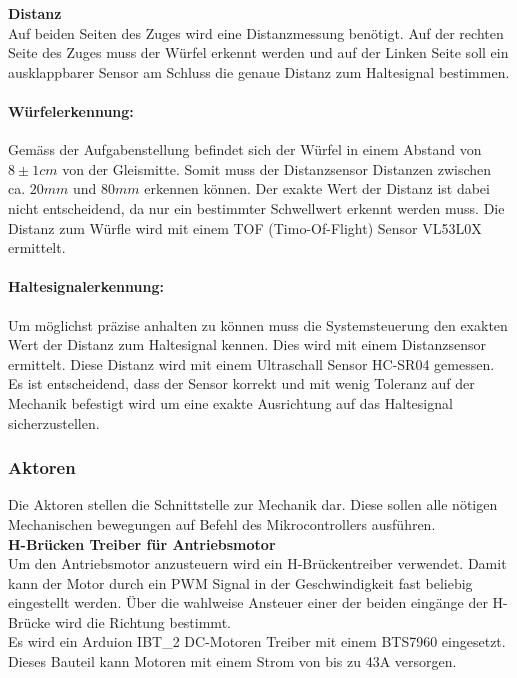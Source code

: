 \documentclass[../../main.tex]{subfiles}
\begin{document}
    \textbf{Distanz}\\
    Auf beiden Seiten des Zuges wird eine Distanzmessung benötigt. Auf der rechten Seite des Zuges muss der Würfel erkennt werden und auf der Linken Seite soll ein ausklappbarer Sensor am Schluss die genaue Distanz zum Haltesignal bestimmen.

    \paragraph{Würfelerkennung:}
    Gemäss der Aufgabenstellung befindet sich der Würfel in einem Abstand von $8\pm1cm$ von der Gleismitte. Somit muss der Distanzsensor Distanzen zwischen ca. $20mm$ und $80mm$ erkennen können. Der exakte Wert der Distanz ist dabei nicht entscheidend, da nur ein bestimmter Schwellwert erkennt werden muss. Die Distanz zum Würfle wird mit einem TOF (Timo-Of-Flight) Sensor VL53L0X ermittelt.

    \paragraph{Haltesignalerkennung:}
    Um möglichst präzise anhalten zu können muss die Systemsteuerung den exakten Wert der Distanz zum Haltesignal kennen. Dies wird mit einem Distanzsensor ermittelt. Diese Distanz wird mit einem Ultraschall Sensor HC-SR04 gemessen. Es ist entscheidend, dass der Sensor korrekt und mit wenig Toleranz auf der Mechanik befestigt wird um eine exakte Ausrichtung auf das Haltesignal sicherzustellen.
    
    \subsubsection{Aktoren}
    Die Aktoren stellen die Schnittstelle zur Mechanik dar. Diese sollen alle nötigen Mechanischen bewegungen auf Befehl des Mikrocontrollers ausführen.\\

    \textbf{H-Brücken Treiber für Antriebsmotor}\\
    Um den Antriebsmotor anzusteuern wird ein H-Brückentreiber verwendet. Damit kann der Motor durch ein PWM Signal in der Geschwindigkeit fast beliebig eingestellt werden. Über die wahlweise Ansteuer einer der beiden eingänge der H-Brücke wird die Richtung bestimmt.\\
    Es wird ein Arduion IBT\_2 DC-Motoren Treiber mit einem BTS7960 eingesetzt. Dieses Bauteil kann Motoren mit einem Strom von bis zu 43A versorgen. \\
    
\end{document}
